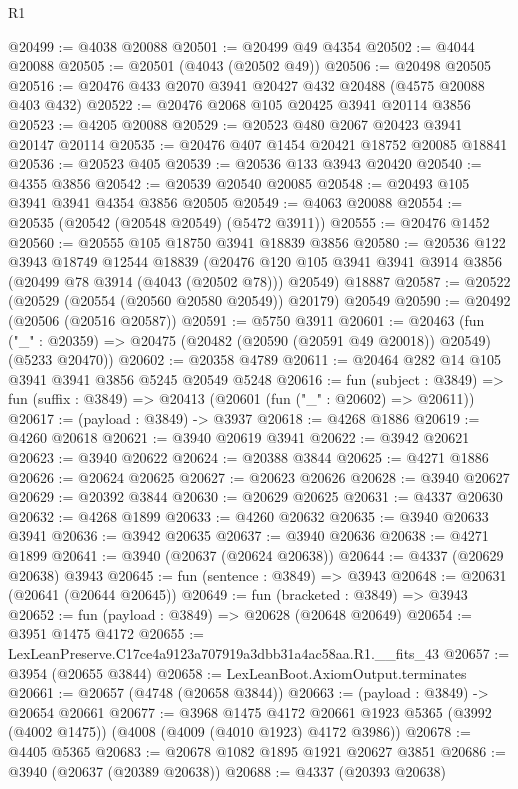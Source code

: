 \begin{lexlean}{R1}
\begin{coremodule}
@20499 := @4038 @20088
@20501 := @20499 @49 @4354
@20502 := @4044 @20088
@20505 := @20501 (@4043 (@20502 @49))
@20506 := @20498 @20505
@20516 := @20476 @433 @2070 @3941 @20427 @432 @20488 (@4575 @20088 @403 @432)
@20522 := @20476 @2068 @105 @20425 @3941 @20114 @3856
@20523 := @4205 @20088
@20529 := @20523 @480 @2067 @20423 @3941 @20147 @20114
@20535 := @20476 @407 @1454 @20421 @18752 @20085 @18841
@20536 := @20523 @405
@20539 := @20536 @133 @3943 @20420
@20540 := @4355 @3856
@20542 := @20539 @20540 @20085
@20548 := @20493 @105 @3941 @3941 @4354 @3856 @20505
@20549 := @4063 @20088
@20554 := @20535 (@20542 (@20548 @20549) (@5472 @3911))
@20555 := @20476 @1452
@20560 := @20555 @105 @18750 @3941 @18839 @3856
@20580 := @20536
    @122
    @3943
    @18749
    @12544
    @18839
    (@20476 @120 @105 @3941 @3941 @3914 @3856 (@20499 @78 @3914 (@4043 (@20502 @78))) @20549)
    @18887
@20587 := @20522 (@20529 (@20554 (@20560 @20580 @20549)) @20179) @20549
@20590 := @20492 (@20506 (@20516 @20587))
@20591 := @5750 @3911
@20601 := @20463
    (fun ("_" : @20359) => @20475 (@20482 (@20590 (@20591 @49 @20018)) @20549) (@5233 @20470))
@20602 := @20358 @4789
@20611 := @20464 @282 @14 @105 @3941 @3941 @3856 @5245 @20549 @5248
@20616 := fun (subject : @3849) =>
  fun (suffix : @3849) => @20413 (@20601 (fun ("_" : @20602) => @20611))
@20617 := (payload : @3849) -> @3937
@20618 := @4268 @1886
@20619 := @4260 @20618
@20621 := @3940 @20619 @3941
@20622 := @3942 @20621
@20623 := @3940 @20622
@20624 := @20388 @3844
@20625 := @4271 @1886
@20626 := @20624 @20625
@20627 := @20623 @20626
@20628 := @3940 @20627
@20629 := @20392 @3844
@20630 := @20629 @20625
@20631 := @4337 @20630
@20632 := @4268 @1899
@20633 := @4260 @20632
@20635 := @3940 @20633 @3941
@20636 := @3942 @20635
@20637 := @3940 @20636
@20638 := @4271 @1899
@20641 := @3940 (@20637 (@20624 @20638))
@20644 := @4337 (@20629 @20638) @3943
@20645 := fun (sentence : @3849) => @3943
@20648 := @20631 (@20641 (@20644 @20645))
@20649 := fun (bracketed : @3849) => @3943
@20652 := fun (payload : @3849) => @20628 (@20648 @20649)
@20654 := @3951 @1475 @4172
@20655 := LexLeanPreserve.C17ce4a9123a707919a3dbb31a4ac58aa.R1.__fits_43
@20657 := @3954 (@20655 @3844)
@20658 := LexLeanBoot.AxiomOutput.terminates
@20661 := @20657 (@4748 (@20658 @3844))
@20663 := (payload : @3849) -> @20654 @20661
@20677 := @3968
    @1475
    @4172
    @20661
    @1923
    @5365
    (@3992 (@4002 @1475))
    (@4008 (@4009 (@4010 @1923) @4172 @3986))
@20678 := @4405 @5365
@20683 := @20678 @1082 @1895 @1921 @20627 @3851
@20686 := @3940 (@20637 (@20389 @20638))
@20688 := @4337 (@20393 @20638)

\end{coremodule}
\end{lexlean}

